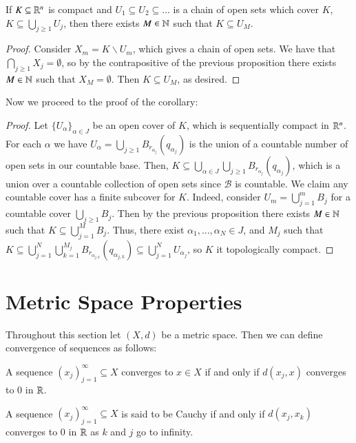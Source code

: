 \begin{prop}
    If $K \subseteq \mathbb R^n$ is compact and $U_1\subseteq U_2\subseteq ...$ is a chain of open sets which cover $K$, $K \subseteq \bigcup_{j\geq 1}U_j$, then there exists $M \in \mathbb N$ such that $K \subseteq U_M$.
\end{prop}
\begin{proof}
    Consider $X_m = K\backslash U_m$, which gives a chain of open sets. We have that $\bigcap_{j\geq 1}X_j = \emptyset$, so by the contrapositive of the previous proposition there exists $M \in \mathbb N$ such that $X_M = \emptyset$. Then $K \subseteq U_M$, as desired.
\end{proof}

Now we proceed to the proof of the corollary:

\begin{proof}
    Let $\{U_{\alpha}\}_{\alpha \in J}$ be an open cover of $K$, which is sequentially compact in $\mathbb R^n$. For each $\alpha$ we have $U_{\alpha} = \bigcup_{j\geq 1}B_{r_{\alpha_j}}(q_{\alpha_j})$ is the union of a countable number of open sets in our countable base. Then, $K \subseteq \bigcup_{\alpha \in J}\bigcup_{j\geq 1}B_{r_{\alpha_j}}(q_{\alpha_j})$, which is a union over a countable collection of open sets since $\mathcal{B}$ is countable. We claim any countable cover has a finite subcover for $K$. Indeed, consider $U_m = \bigcup_{j=1}^mB_j$ for a countable cover $\bigcup_{j\geq 1}B_j$. Then by the previous proposition there exists $M \in \mathbb N$ such that $K \subseteq \bigcup_{j=1}^MB_j$. Thus, there exist $\alpha_1,...,\alpha_N \in J$, and $M_j$ such that $K \subseteq \bigcup_{j=1}^N\bigcup_{k=1}^{M_j}B_{r_{\alpha_{j,k}}}(q_{\alpha_{j,k}}) \subseteq \bigcup_{j=1}^NU_{\alpha_j}$, so $K$ it topologically compact.
\end{proof}

\section{Metric Space Properties}

Throughout this section let $(X,d)$ be a metric space. Then we can define convergence of sequences as follows: 

\begin{defn}
    A sequence $(x_j)_{j=1}^{\infty} \subseteq X$ converges to $x \in X$ if and only if $d(x_j,x)$ converges to $0$ in $\mathbb R$.
\end{defn}

\begin{defn}
    A sequence $(x_j)_{j=1}^{\infty}\subseteq X$ is said to be Cauchy if and only if $d(x_j,x_k)$ converges to $0$ in $\mathbb R$ as $k$ and $j$ go to infinity.
\end{defn}

